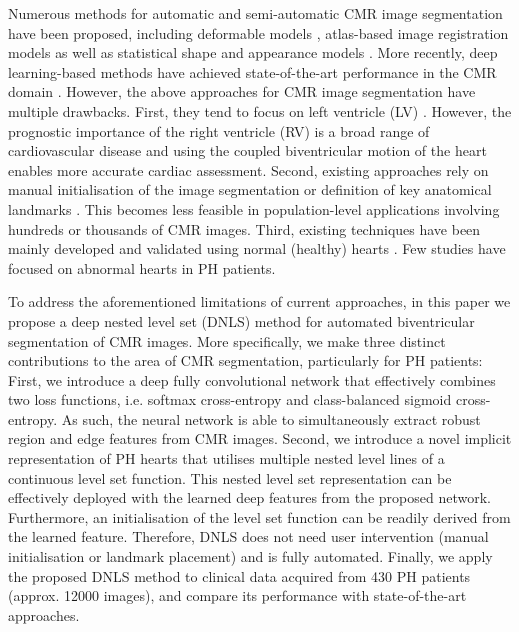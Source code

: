 \documentclass[runningheads,a4paper]{llncs}
\begin{document}
Numerous methods for automatic and semi-automatic CMR image segmentation have been proposed, including deformable models \cite{feng2013segmentation}, atlas-based image registration models \cite{bai2013probabilistic} as well as statistical shape and appearance models \cite{alba2016algorithm}. More recently, deep learning-based methods have achieved state-of-the-art performance in the CMR domain \cite{bai2017human}. However, the above approaches for CMR image segmentation have multiple drawbacks. First, they tend to focus on left ventricle (LV) \cite{feng2013segmentation}. However, the prognostic importance of the right ventricle (RV) is a broad range of cardiovascular disease and using the coupled biventricular motion of the heart enables more accurate cardiac assessment. Second, existing approaches rely on manual initialisation of the image segmentation or definition of key anatomical landmarks \cite{feng2013segmentation,bai2013probabilistic,alba2016algorithm}. This becomes less feasible in population-level applications involving hundreds or thousands of CMR images. Third, existing techniques have been mainly developed and validated using normal (healthy) hearts \cite{feng2013segmentation,bai2013probabilistic,bai2017human}. Few studies have focused on abnormal hearts in PH patients.

To address the aforementioned limitations of current approaches, in this paper we propose a deep nested level set (DNLS) method for automated biventricular segmentation of CMR images. More specifically, we make three distinct contributions to the area of CMR segmentation, particularly for PH patients: First, we introduce a deep fully convolutional network that effectively combines two loss functions, i.e. softmax cross-entropy and class-balanced sigmoid cross-entropy. As such, the neural network is able to simultaneously extract robust region and edge features from CMR images. Second, we introduce a novel implicit representation of PH hearts that utilises multiple nested level lines of a continuous level set function. This nested level set representation can be effectively deployed with the learned deep features from the proposed network. Furthermore, an initialisation of the level set function can be readily derived from the learned feature. Therefore, DNLS does not need user intervention (manual initialisation or landmark placement) and is fully automated. Finally, we apply the proposed DNLS method to clinical data acquired from 430 PH patients (approx. 12000 images), and compare its performance with state-of-the-art approaches.
\end{document}
